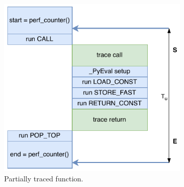 \begin{figure}[H]
    \centering
    \begin{subfigure}[b]{0.45\textwidth}
       \centering
       \includegraphics[width=\textwidth]{images/profiling_bytecode/untraced_run.drawio.pdf}
       \vspace{2em}
       \caption{Partially traced function.}
       \label{figure:profiler-untraced-run}
    \end{subfigure}
    \hfill
    \begin{subfigure}[b]{0.45\textwidth}
       \centering

\end{subfigure}
\end{figure}
